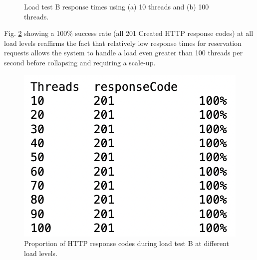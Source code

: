 \begin{figure}[H]
  \centering
  \caption{Load test B response times using (a) 10 threads and (b) 100 threads.}
  \label{fig:cs01-ltb-12}
\end{figure}

Fig. \ref{fig:cs01-ltb-3} showing a 100\% success rate (all 201 Created HTTP response codes) at all load levels reaffirms the fact that relatively low response times for reservation requests allows the system to handle a load even greater than 100 threads per second before collapsing and requiring a scale-up.


\begin{figure}[H]
  \centering
  \includegraphics[width=0.35\linewidth]{./assets/images/case-study-01/cs01-ltb-3.png}
  \caption{Proportion of HTTP response codes during load test B at different load levels.}
  \label{fig:cs01-ltb-3}
\end{figure}

